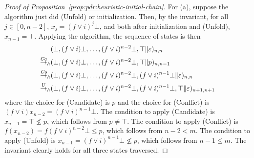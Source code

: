 \begin{proof}[Proof of Proposition~\ref{prop:pdr:heuristic-initial-chain}]
	For (a), suppose the algorithm just did (Unfold) or initialization. Then, by the invariant, for all $j \in [0,n-2]$, $x_j=(f\lor i)^{j}\bot$, and both after initialization and (Unfold), $x_{n-1} = \top$.
	Applying the algorithm, the sequence of states is then
	\begin{align*}
		                     & ( \bot, (f\lor i)\bot, \dots, (f\lor i)^{n-2}\bot, \top \| \varepsilon )_{n,n}                          \\
		{\stackrel{\mathit{Ca}}{\to}}_{h} & ( \bot, (f\lor i)\bot, \dots, (f\lor i)^{n-2}\bot, \top \| p )_{n,n-1}                                  \\
		{\stackrel{\mathit{Co}}{\to}}_{h} & ( \bot, (f\lor i)\bot, \dots, (f\lor i)^{n-2}\bot, (f\lor i)^{n-1}\bot \| \varepsilon )_{n,n}           \\
		{\stackrel{U}{\to}}_{h}           & ( \bot, (f\lor i)\bot, \dots, (f\lor i)^{n-2}\bot, (f\lor i)^{n-1}\bot, \top \| \varepsilon )_{n+1,n+1}
	\end{align*}
	where the choice for (Candidate) is $p$ and the choice for (Conflict) is $(f\lor i) x_{n-2} = (f\lor i)^{n-1} \bot$.
	The condition to apply (Candidate) is $x_{n-1} = \top \not\leq p$, which follows from $p \neq \top$.
	The condition to apply (Conflict) is $f (x_{n-2}) = f (f\lor i)^{n-2}\bot \leq p$, which follows from $n - 2 < m$.
	The condition to apply (Unfold) is $x_{n-1} = (f\lor i)^{n-1}\bot \not\leq p$, which follows from $n - 1 \le m$.
	The invariant clearly holds for all three states traversed.


\end{proof}
